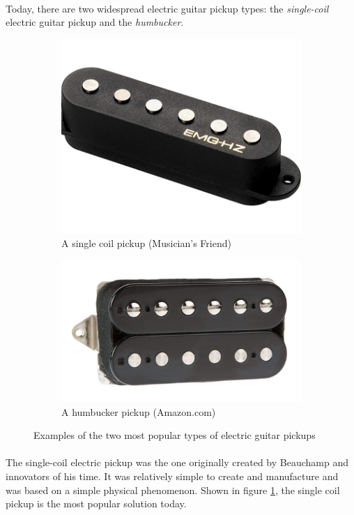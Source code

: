 \documentclass{article}
\begin{document}
\paragraph*{}
Today, there are two widespread electric guitar pickup types: the
\textit{single-coil} electric guitar pickup and the \textit{humbucker}.
\begin{figure}[ht]
	\begin{subfigure}{.5\textwidth}
		\centering
		\includegraphics[width=.8\linewidth]{img/sc-pickup}
		\caption{A single coil pickup (Musician's Friend)}
		\label{fig:sc-pickup}
	\end{subfigure}
	\begin{subfigure}{.5\textwidth}
		\centering
		\includegraphics[width=.8\linewidth]{img/hum-pickup}
		\caption{A humbucker pickup (Amazon.com)}
		\label{fig:hum-pickup}
	\end{subfigure}
	\caption{Examples of the two most popular types of electric guitar pickups}
\end{figure}

\paragraph*{}
The single-coil electric pickup was the one originally created by Beauchamp and
innovators of his time. It was relatively simple to create and manufacture and
was based on a simple physical phenomenon. Shown in figure \ref{fig:sc-pickup},
the single coil pickup is the most popular solution today.
\end{document}
